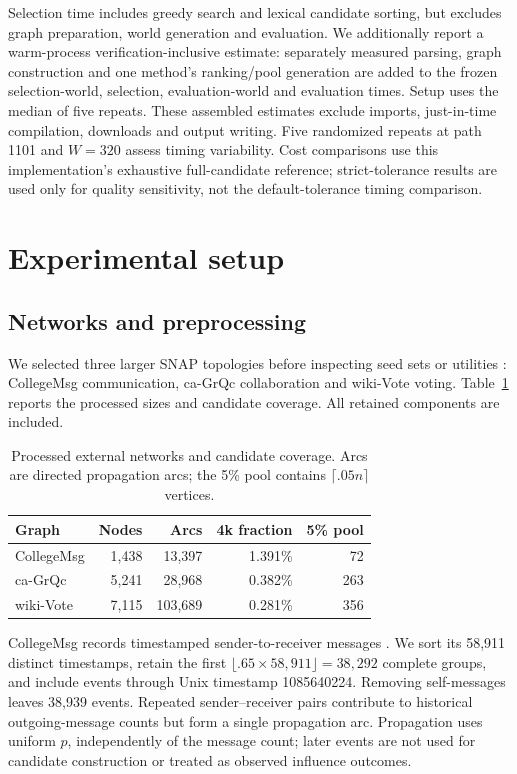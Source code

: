 \documentclass[smallextended]{svjour3}
\begin{document}
Selection time includes greedy search and lexical candidate sorting, but excludes graph preparation, world generation and evaluation. We additionally report a warm-process verification-inclusive estimate: separately measured parsing, graph construction and one method's ranking/pool generation are added to the frozen selection-world, selection, evaluation-world and evaluation times. Setup uses the median of five repeats. These assembled estimates exclude imports, just-in-time compilation, downloads and output writing. Five randomized repeats at path 1101 and $W=320$ assess timing variability. Cost comparisons use this implementation's exhaustive full-candidate reference; strict-tolerance results are used only for quality sensitivity, not the default-tolerance timing comparison.

\section{Experimental setup}
\subsection{Networks and preprocessing}
We selected three larger SNAP topologies before inspecting seed sets or utilities \cite{snap}: CollegeMsg communication, ca-GrQc collaboration and wiki-Vote voting. Table~\ref{tab:data} reports the processed sizes and candidate coverage. All retained components are included.
\begin{table}[htbp]
\caption{Processed external networks and candidate coverage. Arcs are directed propagation arcs; the 5\% pool contains $\lceil .05n\rceil$ vertices.}\label{tab:data}
\begin{tabular}{lrrrr}
\toprule
Graph & Nodes & Arcs & 4k fraction & 5\% pool \\
\midrule
CollegeMsg & 1,438 & 13,397 & 1.391\% & 72 \\
ca-GrQc & 5,241 & 28,968 & 0.382\% & 263 \\
wiki-Vote & 7,115 & 103,689 & 0.281\% & 356 \\
\bottomrule
\end{tabular}
\end{table}

CollegeMsg records timestamped sender-to-receiver messages \cite{college}. We sort its 58,911 distinct timestamps, retain the first $\lfloor .65\times58,911\rfloor=38,292$ complete groups, and include events through Unix timestamp 1085640224. Removing self-messages leaves 38,939 events. Repeated sender--receiver pairs contribute to historical outgoing-message counts but form a single propagation arc. Propagation uses uniform $p$, independently of the message count; later events are not used for candidate construction or treated as observed influence outcomes.
\end{document}
